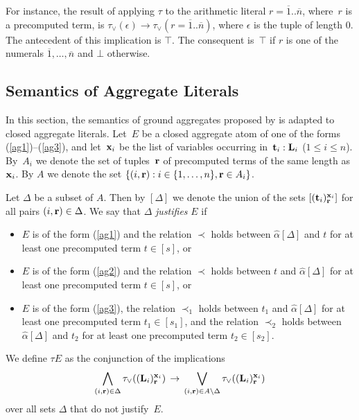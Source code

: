 \documentclass{tlp}
\def\rar{\rightarrow}
\def\beq{\begin{equation}}
\def\eeq#1{\label{#1}\end{equation}}
\begin{document}
For instance, the result of applying $\tau$ to the arithmetic literal 
$r = \overline 1 .. \overline n$, where~$r$ is a precomputed term, is 
$\tau_{\lor}(\epsilon) \rar \tau_{\lor}(r = \overline 1 .. \overline n)$, where
$\epsilon$ is the tuple of length $0$.  
The antecedent of this implication is $\top$. The consequent is~$\top$ if 
$r$ is one of the numerals $\overline 1, \dots, \overline n$ and $\bot$ otherwise. 

\subsection{Semantics of Aggregate Literals}\label{sem:ag}

In this section, the semantics of ground aggregates proposed by 
 \citeyear[Section~4.1]{fer05} is adapted to closed aggregate 
literals.  Let~$E$
be a closed aggregate atom of one of the forms (\ref{ag1})--(\ref{ag3}), and
let~${\bf x}_i$ be the list of variables occurring in~${\bf t}_i:{\bf L}_i$
\hbox{($1\le i\le n$)}.  By~$A_i$ we denote the set of tuples~${\bf r}$ of
precomputed terms of the same length as~${\bf x}_i$.  
By $A$ we denote the
set $\{(i, {\bf r}) : i \in \{1, \dots, n\}, {\bf r} \in A_i\}$. 

Let $\Delta$ be a subset of $A$. Then by $[\Delta]$ we denote 
the union of the sets $[({\bf t}_i)^{{\bf x}_i}_{\bf r}]$ for all pairs
$(i, {\bf r})\in\Delta$.
We say that $\Delta$ {\sl justifies} $E$ if
\begin{itemize}
\item  $E$ is of the form (\ref{ag1}) and the relation $\prec$ holds 
between $\widehat \alpha
[{\Delta}]$ and $t$ for at least one precomputed term $t \in [s]$,  or
\item $E$ is of the form (\ref{ag2}) and the relation $\prec$ holds between $t$ and 
$\widehat \alpha [{\Delta}]$ for at least one precomputed term $t \in [s]$, or
\item $E$ is of the 
form (\ref{ag3}), the relation 
$\prec_1$ holds between $t_1$ and $\widehat \alpha [\Delta]$ for at least one 
precomputed term $t_1 \in [s_1]$, and the relation $\prec_2$ holds between $\widehat
\alpha [\Delta]$ and $t_2$ for at least one precomputed term $t_2 \in [s_2]$. 
\end{itemize}

We define $\tau E$ as the conjunction of the implications
\beq
  \bigwedge_{(i, {\bf r})\in\Delta}\tau_{\lor}(({\bf L}_i)^{{\bf x}_i}_{\bf r})
  \,\rar\,
  \bigvee_{(i,{\bf r})\in A\setminus\Delta}\tau_{\lor}(({\bf L}_i)^{{\bf x}_i}_
  {\bf r})
\eeq{agdef}
over all sets $\Delta$ that do not justify~$E$.
\end{document}
